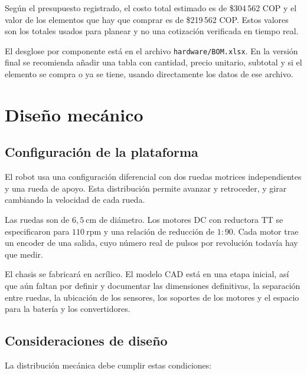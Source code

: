 \documentclass[journal]{IEEEtran}
\begin{document}
Según el presupuesto registrado, el costo total estimado es de \$304\,562 COP y el valor de los elementos que hay que comprar es de \$219\,562 COP. Estos valores son los totales usados para planear y no una cotización verificada en tiempo real.

El desglose por componente está en el archivo \texttt{hardware/BOM.xlsx}. En la versión final se recomienda añadir una tabla con cantidad, precio unitario, subtotal y si el elemento se compra o ya se tiene, usando directamente los datos de ese archivo.


\section{Diseño mecánico}

\subsection{Configuración de la plataforma}

El robot usa una configuración diferencial con dos ruedas motrices independientes y una rueda de apoyo. Esta distribución permite avanzar y retroceder, y girar cambiando la velocidad de cada rueda.

Las ruedas son de $6{,}5~\mathrm{cm}$ de diámetro. Los motores DC con reductora TT se especificaron para $110~\mathrm{rpm}$ y una relación de reducción de $1:90$. Cada motor trae un encoder de una salida, cuyo número real de pulsos por revolución todavía hay que medir.

El chasis se fabricará en acrílico. El modelo CAD está en una etapa inicial, así que aún faltan por definir y documentar las dimensiones definitivas, la separación entre ruedas, la ubicación de los sensores, los soportes de los motores y el espacio para la batería y los convertidores.

\subsection{Consideraciones de diseño}

La distribución mecánica debe cumplir estas condiciones:
\end{document}
